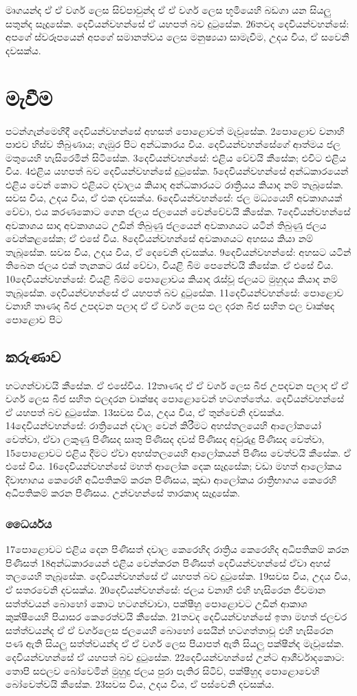 \documentclass[10pt]{book}
\begin{document}
මෘගයන්ද ඒ ඒ වර්ග ලෙස සිව්පාවුන්ද ඒ ඒ වර්ග ලෙස භූමියෙහි බඩගා යන සියලු සතුන්ද සෑදූසේක. දෙවියන්වහන්සේ ඒ යහපත් බව දුටුසේක. 26තවද දෙවියන්වහන්සේ: අපගේ ස්වරූපයෙන් අපගේ සමානත්වය ලෙස මනුෂ්‍යයා සාමැවීම, උදය විය, ඒ සවෙනි දවසක්ය. 
 
\section{මැවීම}                  
පටන්ගැන්මෙහිදී දෙවියන්වහන්සේ අහසත් පොළොවත් මැවූසේක. 2පොළොව වනාහි පාළුව හිස්ව තිබුණාය; ගැඹුර පිට අන්ධකාරය විය. දෙවියන්වහන්සේගේ ආත්මය ජල මතුයෙහි හැසිරෙමින් සිටිසේක. 3දෙවියන්වහන්සේ: එළිය වේවයි කීසේක; එවිට එළිය විය. 4එළිය යහපත් බව දෙවියන්වහන්සේ දුටුසේක. 5දෙවියන්වහන්සේ අන්ධකාරයෙන් එළිය වෙන් කොට එළියට දවාලය කියාද අන්ධකාරයට රාත්‍රියය කියාද නම් තැබූසේක. සවස විය, උදය විය, ඒ එක දවසක්ය. 6දෙවියන්වහන්සේ: ජල මධ්‍යයෙහි අවකාශයක් වේවා, එය කරණකොට ගෙන ජලය ජලයෙන් වෙන්වේවයි කීසේක. 7දෙවියන්වහන්සේ අවකාශය සාදා අවකාශයට උඩින් තිබුණු ජලයෙන් අවකාශයට යටින් තිබුණු ජලය වෙන්කළසේක; ඒ එසේ විය. 8දෙවියන්වහන්සේ අවකාශයට අහසය කියා නම් තැබූසේක. සවස විය, උදය විය, ඒ දෙවෙනි දවසක්ය. 9දෙවියන්වහන්සේ: අහසට යටින් තිබෙන ජලය එක් තැනකට රැස් වේවා, වියළි බිම පෙනේවයි කීසේක. ඒ එසේ විය. 10දෙවියන්වහන්සේ: වියළි බිමට පොළොවය කියාද රැස්වූ ජලයට මුහුදය කියාද නම් තැබූසේක. දෙවියන්වහන්සේ ඒ යහපත් බව දුටුසේක. 11දෙවියන්වහන්සේ: පොළොව වනාහි තෘණද බීජ උපදවන පලාද ඒ ඒ වර්ග ලෙස ඵල දරන බීජ සහිත ඵල වෘක්ෂද පොළොව පිට 

\subsection{කරුණාව}
හටගන්වාවයි කීසේක. ඒ එසේවිය. 12තෘණද ඒ ඒ වර්ග ලෙස බීජ උපදවන පලාද ඒ ඒ වර්ග ලෙස බීජ සහිත ඵලදරන වෘක්ෂද පොළොවෙන් හටගත්තේය. දෙවියන්වහන්සේ ඒ යහපත් බව දුටුසේක. 13සවස විය, උදය විය, ඒ තුන්වෙනි දවසක්ය. 14දෙවියන්වහන්සේ: රාත්‍රියෙන් දවාල වෙන් කිරීමට අහස්තලයෙහි ආලෝකයෝ වෙත්වා, ඒවා ලකුණු පිණිසද සෘතු පිණිසද දවස් පිණිසද අවුරුදු පිණිසද වෙත්වා, 15පොළොවට එළිය දීමට ඒවා අහස්තලයෙහි ආලෝකයන් පිණිස වෙත්වයි කීසේක. ඒ එසේ විය. 16දෙවියන්වහන්සේ මහත් ආලෝක දෙක සෑදූසේක; වඩා මහත් ආලෝකය දිවාභාගය කෙරෙහි අධිපතිකම් කරන පිණිසය, කුඩා ආලෝකය රාත්‍රිභාගය කෙරෙහි අධිපතිකම් කරන පිණිසය. උන්වහන්සේ තාරකාද සෑදූසේක.

\subsubsection{ධෛර්යය}
 17පොළොවට එළිය දෙන පිණිසත් දවාල කෙරෙහිද රාත්‍රිය කෙරෙහිද අධිපතිකම් කරන පිණිසත් 18අන්ධකාරයෙන් එළිය වෙන්කරන පිණිසත් දෙවියන්වහන්සේ ඒවා අහස් තලයෙහි තැබූසේක. දෙවියන්වහන්සේ ඒ යහපත් බව දුටුසේක. 19සවස විය, උදය විය, ඒ සතරවෙනි දවසක්ය. 20දෙවියන්වහන්සේ: ජලය වනාහි එහි හැසිරෙන ජීවමාන සත්ත්වයන් බොහෝ කොට හටගන්වාවා, පක්ෂීහු පොළොවට උඩින් ආකාශ කුක්ෂීයෙහි පියාසර කෙරෙත්වයි කීසේක. 21තවද දෙවියන්වහන්සේ ඉතා මහත් ජලචර සත්ත්වයන්ද ඒ ඒ වර්ගලෙස ජලයෙහි බොහෝ සෙයින් හටගත්තාවූ එහි හැසිරෙන පණ ඇති සියලු සත්ත්වයන්ද ඒ ඒ වර්ග ලෙස පියාපත් ඇති සියලු පක්ෂීන්ද මැවූසේක. දෙවියන්වහන්සේ ඒ යහපත් බව දුටුසේක. 22දෙවියන්වහන්සේ උන්ට ආශීර්වාදකොට: තොපි සඵලව බෝවෙමින් මුහුදු ජලය පුරා පැතිර සිටිව්, පක්ෂීහුද පොළොවෙහි බෝවෙත්වයි කීසේක. 23සවස විය, උදය විය, ඒ පස්වෙනි දවසක්ය.
 
\end{document}
